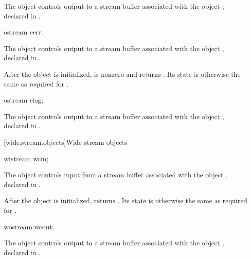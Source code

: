 \begin{itemdescr}
\pnum
The object 
controls output to a stream buffer associated with the object ,
declared in .
\end{itemdescr}

%
\begin{itemdecl}
ostream cerr;
\end{itemdecl}

\begin{itemdescr}
\pnum
The object 
controls output to a stream buffer associated with the object ,
declared in .

\pnum
After the object
is initialized,
is nonzero and  returns .
Its state is otherwise the same as required for
.
\end{itemdescr}

%
\begin{itemdecl}
ostream clog;
\end{itemdecl}

\begin{itemdescr}
\pnum
The object 
controls output to a stream buffer
associated with the object ,
declared in .
\end{itemdescr}

[wide.stream.objects]{Wide stream objects}

%
\begin{itemdecl}
wistream wcin;
\end{itemdecl}

\begin{itemdescr}
\pnum
The object 
controls input from a stream buffer associated with the object ,
declared in .

\pnum
After the object
is initialized,
returns
.
Its state is otherwise the same as required for
.
\end{itemdescr}

%
\begin{itemdecl}
wostream wcout;
\end{itemdecl}

\begin{itemdescr}
\pnum
The object 
controls output to a stream buffer associated with the object ,
declared in .
\end{itemdescr}

